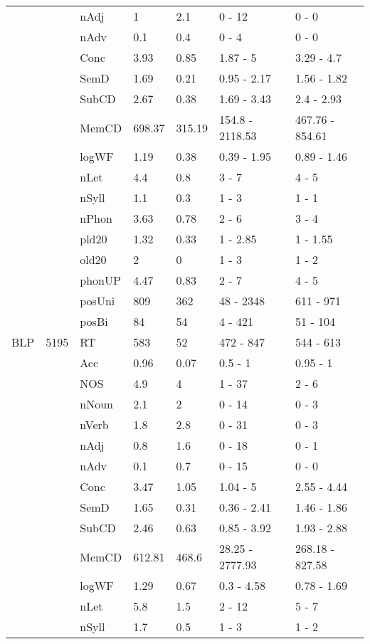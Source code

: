 \begin{table}[ht]
\begin{tabular}{lllllll}
   &  & nAdj & 1 & 2.1 & 0 - 12 & 0 - 0 \\ 
   &  & nAdv & 0.1 & 0.4 & 0 - 4 & 0 - 0 \\ 
   &  & Conc & 3.93 & 0.85 & 1.87 - 5 & 3.29 - 4.7 \\ 
   &  & SemD & 1.69 & 0.21 & 0.95 - 2.17 & 1.56 - 1.82 \\ 
   &  & SubCD & 2.67 & 0.38 & 1.69 - 3.43 & 2.4 - 2.93 \\ 
   &  & MemCD & 698.37 & 315.19 & 154.8 - 2118.53 & 467.76 - 854.61 \\ 
   &  & logWF & 1.19 & 0.38 & 0.39 - 1.95 & 0.89 - 1.46 \\ 
   &  & nLet & 4.4 & 0.8 & 3 - 7 & 4 - 5 \\ 
   &  & nSyll & 1.1 & 0.3 & 1 - 3 & 1 - 1 \\ 
   &  & nPhon & 3.63 & 0.78 & 2 - 6 & 3 - 4 \\ 
   &  & pld20 & 1.32 & 0.33 & 1 - 2.85 & 1 - 1.55 \\ 
   &  & old20 & 2 & 0 & 1 - 3 & 1 - 2 \\ 
   &  & phonUP & 4.47 & 0.83 & 2 - 7 & 4 - 5 \\ 
   &  & posUni & 809 & 362 & 48 - 2348 & 611 - 971 \\ 
   &  & posBi & 84 & 54 & 4 - 421 & 51 - 104 \\ 
  BLP & 5195 & RT & 583 & 52 & 472 - 847 & 544 - 613 \\ 
   &  & Acc & 0.96 & 0.07 & 0.5 - 1 & 0.95 - 1 \\ 
   &  & NOS & 4.9 & 4 & 1 - 37 & 2 - 6 \\ 
   &  & nNoun & 2.1 & 2 & 0 - 14 & 0 - 3 \\ 
   &  & nVerb & 1.8 & 2.8 & 0 - 31 & 0 - 3 \\ 
   &  & nAdj & 0.8 & 1.6 & 0 - 18 & 0 - 1 \\ 
   &  & nAdv & 0.1 & 0.7 & 0 - 15 & 0 - 0 \\ 
   &  & Conc & 3.47 & 1.05 & 1.04 - 5 & 2.55 - 4.44 \\ 
   &  & SemD & 1.65 & 0.31 & 0.36 - 2.41 & 1.46 - 1.86 \\ 
   &  & SubCD & 2.46 & 0.63 & 0.85 - 3.92 & 1.93 - 2.88 \\ 
   &  & MemCD & 612.81 & 468.6 & 28.25 - 2777.93 & 268.18 - 827.58 \\ 
   &  & logWF & 1.29 & 0.67 & 0.3 - 4.58 & 0.78 - 1.69 \\ 
   &  & nLet & 5.8 & 1.5 & 2 - 12 & 5 - 7 \\ 
   &  & nSyll & 1.7 & 0.5 & 1 - 3 & 1 - 2 \\ 

\end{tabular}
\end{table}
